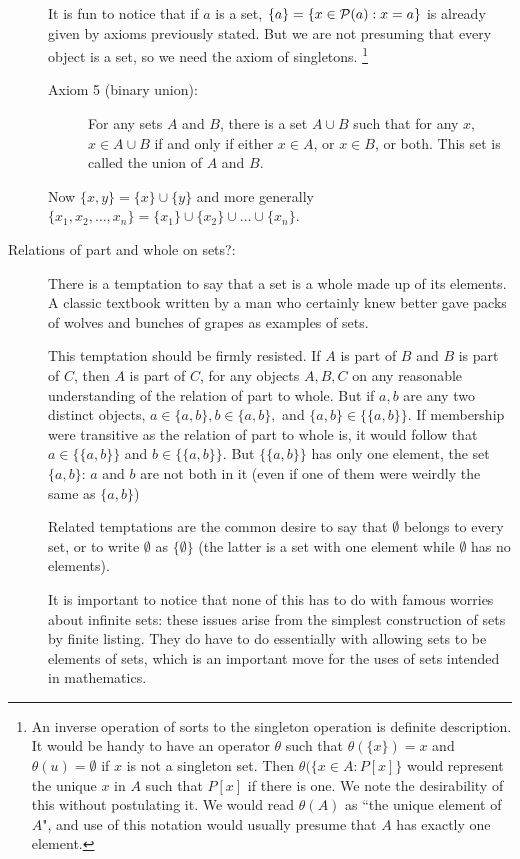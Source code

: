 \documentclass[12pt]{article}
\begin{document}
\begin{description}
It is fun to notice that if $a$ is a set, $\{a\} = \{x \in {\cal P}(a):x=a\}$ is already given by axioms previously stated.
But we are not presuming that every object is a set, so we need the axiom of singletons. \footnote{An inverse operation of sorts to the singleton operation is definite description.  It would be handy to have an operator
$\theta$ such that $\theta(\{x\}) = x$ and $\theta(u) = \emptyset$ if $x$ is not a singleton set.  Then $\theta(\{x \in A:P[x]\}$ would represent the unique $x$ in $A$ such that $P[x]$ if there is one.   We note the desirability of this without postulating it.  We would read $\theta(A)$ as ``the unique element of $A$", and use of this notation would usually presume
that $A$ has exactly one element.}

\begin{description}
\item[Axiom 5 (binary union):]  For any sets $A$ and $B$, there is a set $A \cup B$ such that for any $x$, $x \in A \cup B$ if and only if 
either $x \in A$, or $x \in B$, or both.  This set is called the union of $A$ and $B$.
\end{description}

Now $\{x,y\} = \{x\} \cup \{y\}$ and more generally $\{x_1,x_2,\ldots,x_n\} = \{x_1\} \cup \{x_2\} \cup \ldots \cup \{x_n\}$.

\item[Relations of part and whole on sets?:]  There is a temptation to say that a set is a whole made up of its elements.
A classic textbook written by a man who certainly knew better gave packs of wolves and bunches of grapes as examples of sets.

This temptation should be firmly resisted.  If $A$ is part of $B$ and $B$ is part of $C$, then $A$ is part of $C$, for any objects $A,B,C$ on any reasonable understanding of the relation of part to whole.  But if $a,b$ are any two distinct objects, $a \in \{a,b\}, b \in \{a,b\},$ and $\{a,b\} \in \{\{a,b\}\}$.  If membership were transitive as the relation of part to whole is, it would follow that $a \in \{\{a,b\}\}$ and $b \in \{\{a,b\}\}$.  But $\{\{a,b\}\}$ has only one element, the set $\{a,b\}$:  $a$ and $b$ are not both in it (even if one of them were weirdly the same as $\{a,b\}$)

Related temptations are the common desire to say that $\emptyset$ belongs to every set, or to write $\emptyset$
as $\{\emptyset\}$ (the latter is a set with one element while $\emptyset$ has no elements).

It is important to notice that none of this has to do with famous worries about infinite sets:  these issues arise from the simplest construction of sets by finite listing.  They do have to do essentially with allowing sets to be elements of sets, which is an important move for the uses of sets intended in mathematics.


\end{description}
\end{document}
